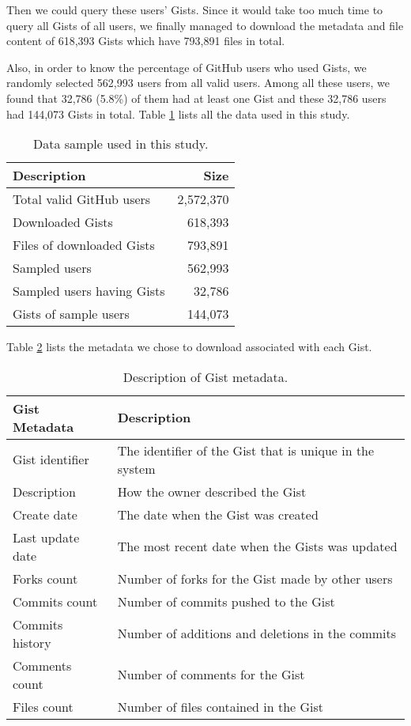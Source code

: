 Then we could query these users' Gists. Since it would take too much time to query all Gists of all users, we finally managed to download the metadata and file content of 618,393 Gists which have 793,891 files in total. 

Also, in order to know the percentage of GitHub users who used Gists, we randomly selected 562,993 users from all valid users. Among all these users, we found that 32,786 (5.8\%) of them had at least one Gist and these 32,786 users had 144,073 Gists in total. Table \ref{tb:data} lists all the data used in this study. 

\begin{table}[!htb]
 \begin{center}
 \begin{tabular}{@{}lr} 
    \textbf{Description}                &   \textbf{Size}\\ \hline
    Total valid GitHub users      &   2,572,370\\
    Downloaded Gists              &   618,393\\
    \quad Files of downloaded Gists     &   793,891\\
    Sampled users                 &   562,993\\
    \quad Sampled users having Gists & 32,786\\
    \quad Gists of sample users & 144,073\\ \hline
 \end{tabular}
 \end{center}
 \caption{Data sample used in this study.}
 \label{tb:data}
\end{table}

Table \ref{tb:gistmetadata} lists the metadata we chose to download associated with each Gist. 
\begin{table}[!htb]
 \begin{center}
 \begin{tabular}{@{}ll} 
    \textbf{Gist Metadata}	&	\textbf{Description}\\ \hline
    Gist identifier	&	The identifier of the Gist that is unique in the system\\
	Description	&	How the owner described the Gist\\
	Create date & The date when the Gist was created\\
	Last update date & The most recent date when the Gists was updated\\
	Forks count & Number of forks for the Gist made by other users\\
	Commits count & Number of commits pushed to the Gist\\
	Commits history & Number of additions and deletions in the commits\\
	Comments count & Number of comments for the Gist\\
	Files count & Number of files contained in the Gist\\ \hline
 \end{tabular}
 \end{center}
 \caption{Description of Gist metadata.}
 \label{tb:gistmetadata}
\end{table}

